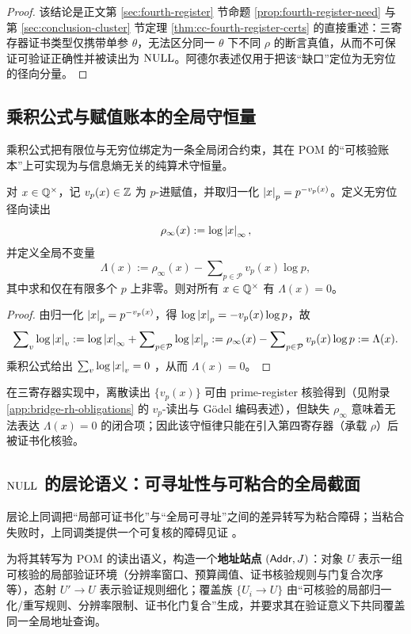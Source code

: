 \begin{proof}
该结论是正文第 \ref{sec:fourth-register} 节命题 \ref{prop:fourth-register-need} 与第 \ref{sec:conclusion-cluster} 节定理 \ref{thm:cc-fourth-register-certs} 的直接重述：三寄存器证书类型仅携带单参 $\theta$，无法区分同一 $\theta$ 下不同 $\rho$ 的断言真值，从而不可保证可验证正确性并被读出为 $\mathrm{NULL}$。阿德尔表述仅用于把该“缺口”定位为无穷位的径向分量。
\end{proof}

\subsection{乘积公式与赋值账本的全局守恒量}\label{subsubsec:future-product-ledger}
乘积公式把有限位与无穷位绑定为一条全局闭合约束，其在 POM 的“可核验账本”上可实现为与信息熵无关的纯算术守恒量。

\begin{proposition}[乘积公式型全局不变量]\label{prop:future-product-formula-invariant}
对 $x\in\mathbb{Q}^\times$，记 $v_p(x)\in\mathbb{Z}$ 为 $p$-进赋值，并取归一化 $\left\lvert x\right\rvert_p=p^{-v_p(x)}$。定义无穷位径向读出
$$
\rho_\infty(x):=\log\left\lvert x\right\rvert_\infty,
$$
并定义全局不变量
$$
\Lambda(x):=\rho_\infty(x)-\sum\nolimits_{p\in\mathcal{P}} v_p(x)\log p,
$$
其中求和仅在有限多个 $p$ 上非零。则对所有 $x\in\mathbb{Q}^\times$ 有 $\Lambda(x)=0$。
\end{proposition}

\begin{proof}
由归一化 $\left\lvert x\right\rvert_p=p^{-v_p(x)}$，得 $\log\left\lvert x\right\rvert_p=-v_p(x)\log p$，故
$$
\sum\nolimits_v \log\left\lvert x\right\rvert_v
:=\log\left\lvert x\right\rvert_\infty+\sum\nolimits_{p\in\mathcal{P}}\log\left\lvert x\right\rvert_p
:=\rho_\infty(x)-\sum\nolimits_{p\in\mathcal{P}} v_p(x)\log p
:=\Lambda(x).
$$
乘积公式给出 $\sum_v \log\left\lvert x\right\rvert_v=0$ \cite{Sutherland2017AdelesStrongApprox,Conrad2005CompactIdele}，从而 $\Lambda(x)=0$。
\end{proof}

\begin{remark}[对三寄存器闭包的含义]
在三寄存器实现中，离散读出 $\{v_p(x)\}$ 可由 prime-register 核验得到（见附录 \ref{app:bridge-rh-obligations} 的 $v_p$-读出与 Gödel 编码表述），但缺失 $\rho_\infty$ 意味着无法表达 $\Lambda(x)=0$ 的闭合项；因此该守恒律只能在引入第四寄存器（承载 $\rho$）后被证书化核验。
\end{remark}

\subsection{\texorpdfstring{$\mathrm{NULL}$}{NULL} 的层论语义：可寻址性与可粘合的全局截面}\label{subsubsec:future-null-sheaf}
层论上同调把“局部可证书化”与“全局可寻址”之间的差异转写为粘合障碍；当粘合失败时，上同调类提供一个可复核的障碍见证 \cite{Wiggins2026SheafCohomology,StacksProject2026CohomologySites}。
\par
为将其转写为 POM 的读出语义，构造一个\textbf{地址站点} $(\mathsf{Addr},J)$：对象 $U$ 表示一组可核验的局部验证环境（分辨率窗口、预算阈值、证书核验规则与门复合次序等），态射 $U'\to U$ 表示验证规则细化；覆盖族 $\{U_i\to U\}$ 由“可核验的局部归一化/重写规则、分辨率限制、证书化门复合”生成，并要求其在验证意义下共同覆盖同一全局地址查询。

